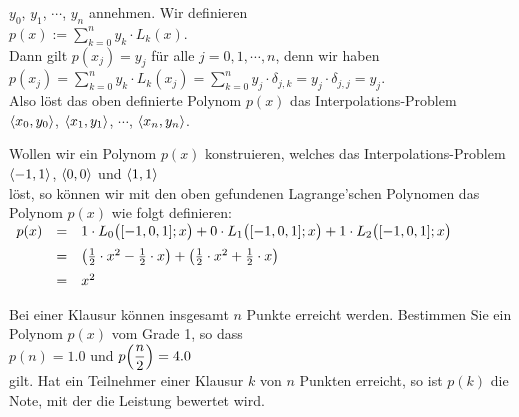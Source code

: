 $y_0$, $y_1$, $\cdots$, $y_n$ annehmen. Wir definieren 
\\[0.3cm]
\hspace*{1.3cm}
$\displaystyle p(x) := \sum\limits_{k=0}^n y_k \cdot  L_k(x)$.
\\[0.3cm]
Dann gilt $p(x_j) = y_j$ f\"ur alle $j=0,1,\cdots,n$, denn wir haben
\\[0.2cm]
\hspace*{1.3cm}
$\displaystyle p(x_j) = \sum\limits_{k=0}^n y_k \cdot  L_k(x_j) = \sum\limits_{k=0}^n y_j \cdot  \delta_{j,k} = y_j \cdot \delta_{j,j} = y_j$. 
\\[0.2cm] 
Also l\"ost das oben definierte Polynom $p(x)$ das Interpolations-Problem 
\\[0.2cm]
\hspace*{1.3cm}
$\pair(x_0, y_0)$, $\pair(x_1, y_1)$, $\cdots$, $\pair(x_n, y_n)$.


\example
Wollen wir ein Polynom $p(x)$ konstruieren, welches das Interpolations-Problem
\\[0.2cm]
\hspace*{1.3cm}
$\pair(-1,1)$, $\pair(0,0)$ und $\pair(1,1)$
\\[0.2cm]
l\"ost, so k\"onnen wir mit den oben gefundenen Lagrange'schen Polynomen das Polynom $p(x)$ wie folgt
definieren: 
\\[0.2cm]
\hspace*{1.3cm}
$
\begin{array}[t]{lcl}
  p(x) & = & 1 \cdot  L_0\bigl([-1,0,1];x\bigr) + 0 \cdot  L_1\bigl([-1,0,1];x\bigr) + 1\cdot L_2\bigl([-1,0,1];x\bigr) \\[0.2cm]
       & = & \bigl(\frac{1}{2}\cdot x^2 - \frac{1}{2}\cdot x\bigr) + \bigl(\frac{1}{2}\cdot x^2 + 
             \frac{1}{2}\cdot x\bigr)  \\[0.2cm]
       & = & x^2
\end{array}
$
\vspace*{0.3cm}


\exercise
Bei einer Klausur k\"onnen insgesamt $n$ Punkte erreicht werden. Bestimmen
Sie ein Polynom $p(x)$ vom Grade 1, so dass
\\[0.2cm]
\hspace*{1.3cm} $p(n) = 1.0$ \quad und \quad $\displaystyle p\Bigl(\frac{n}{2}\Bigr) = 4.0$
\\[0.2cm]
gilt.  Hat ein Teilnehmer einer Klausur $k$ von $n$ Punkten erreicht, so ist $p(k)$ die
Note, mit der die Leistung bewertet wird.  \eox

